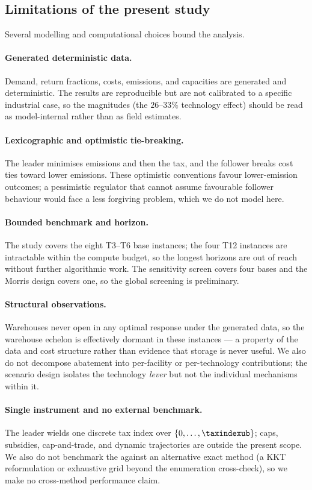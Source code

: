 \subsection{Limitations of the present study}
\label{sec:disc:limitations}

Several modelling and computational choices bound the analysis.

\paragraph{Generated deterministic data.}
Demand, return fractions, costs, emissions, and capacities are generated and
deterministic. The results are reproducible but are not calibrated to a
specific industrial case, so the magnitudes (\eg the $26$--$33\%$ technology
effect) should be read as model-internal rather than as field estimates.

\paragraph{Lexicographic and optimistic tie-breaking.}
The leader minimises emissions and then the tax, and the follower breaks cost
ties toward lower emissions. These optimistic conventions favour
lower-emission outcomes; a pessimistic regulator that cannot assume favourable
follower behaviour would face a less forgiving problem, which we do not model here.

\paragraph{Bounded benchmark and horizon.}
The study covers the eight T3--T6 base instances; the four T12 instances are
intractable within the compute budget, so the longest horizons are out of
reach without further algorithmic work. The sensitivity screen covers four
bases and the Morris design covers one, so the global screening is preliminary.

\paragraph{Structural observations.}
Warehouses never open in any optimal response under the generated data, so the
warehouse echelon is effectively dormant in these instances --- a property of
the data and cost structure rather than evidence that storage is never useful.
We also do not decompose abatement into per-facility or per-technology
contributions; the scenario design isolates the technology \emph{lever} but not
the individual mechanisms within it.

\paragraph{Single instrument and no external benchmark.}
The leader wields one discrete tax index over $\{0,\ldots,\taxindexub\}$; caps,
subsidies, cap-and-trade, and dynamic trajectories are outside the present
scope. We also do not benchmark the \DBP against an alternative exact method
(\eg a KKT reformulation or exhaustive grid beyond the enumeration
cross-check), so we make no cross-method performance claim.

